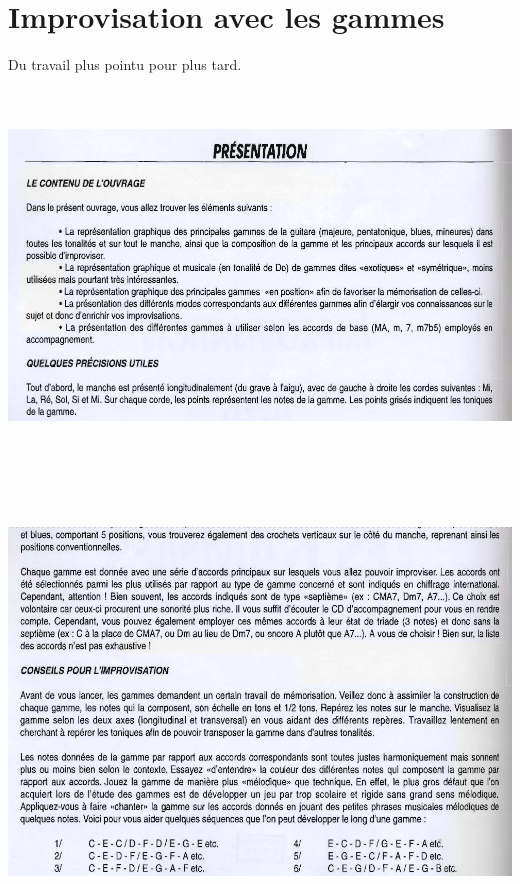 \documentclass[a4paper]{book}
\begin{document}
\clearpage


\section[Improvisation avec les gammes]{Improvisation avec les
gammes}
\hypertarget{RefHeadingToc162973218262}{}Du travail plus pointu pour
plus tard.



\begin{center}
\includegraphics[width=17cm,height=9.841cm]{lebluessupportsmethodes-img105.png}
\end{center}


\begin{center}
\includegraphics[width=17cm,height=11.767cm]{lebluessupportsmethodes-img106.png}
\end{center}
\clearpage
\end{document}
